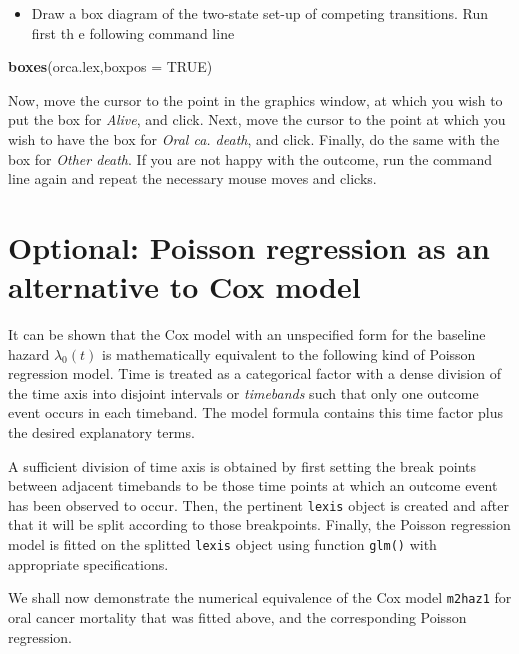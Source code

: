 \documentclass[
]{book}
\newenvironment{Shaded}{\begin{snugshade}}{\end{snugshade}}
\newcommand{\AttributeTok}[1]{\textcolor[rgb]{0.13,0.29,0.53}{#1}}
\newcommand{\ConstantTok}[1]{\textcolor[rgb]{0.56,0.35,0.01}{#1}}
\newcommand{\FunctionTok}[1]{\textcolor[rgb]{0.13,0.29,0.53}{\textbf{#1}}}
\newcommand{\NormalTok}[1]{#1}
\providecommand{\tightlist}{%
  \setlength{\itemsep}{0pt}\setlength{\parskip}{0pt}}
\begin{document}
\begin{itemize}
\tightlist
\item
  Draw a box diagram of the two-state set-up of competing transitions. Run first th e following command line
\end{itemize}

\begin{Shaded}
\begin{Highlighting}[]
\FunctionTok{boxes}\NormalTok{(orca.lex,}\AttributeTok{boxpos =} \ConstantTok{TRUE}\NormalTok{)}
\end{Highlighting}
\end{Shaded}

Now, move the cursor to the point in the graphics window, at which you wish to put the box for \emph{Alive}, and click. Next, move
the cursor to the point at which you wish to have the box for \emph{Oral ca. death}, and click. Finally, do the same with the box for \emph{Other death}.
If you are not happy with the outcome, run the command line again and repeat the necessary mouse moves and clicks.

\section{Optional: Poisson regression as an alternative to Cox model}\label{optional-poisson-regression-as-an-alternative-to-cox-model}

It can be shown that the Cox model with an unspecified form for the
baseline hazard \(\lambda_0(t)\) is mathematically equivalent
to the following kind of Poisson regression model.
Time is treated as a categorical factor with
a dense division of the time axis
into disjoint intervals or \emph{timebands} such that
only one outcome event occurs in each timeband.
The model formula contains this time factor plus the desired
explanatory terms.

A sufficient division of time axis is obtained by
first setting the break points
between adjacent timebands to be those time points at which an outcome event has been observed to occur. Then,
the pertinent \texttt{lexis} object is created
and after that it will be split according to those breakpoints.
Finally, the Poisson regression model is fitted
on the splitted \texttt{lexis} object using function \texttt{glm()} with appropriate specifications.

We shall now demonstrate the numerical equivalence of the Cox model
\texttt{m2haz1} for oral cancer mortality that was fitted above,
and the corresponding Poisson regression.
\end{document}
